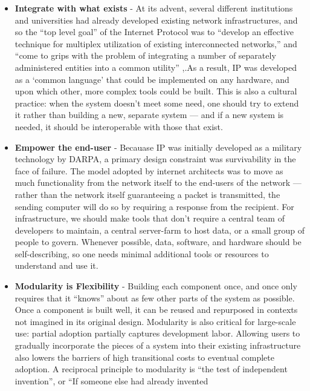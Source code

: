 \documentclass{article}
\begin{document}
\begin{itemize}

\item
  \textbf{Integrate with what exists} - At its advent, several different
  institutions and universities had already developed existing network
  infrastructures, and so the ``top level goal'' of the Internet
  Protocol was to ``develop an effective technique for multiplex
  utilization of existing interconnected networks,'' and ``come to grips
  with the problem of integrating a number of separately administered
  entities into a common utility'' \cite{clarkDesignPhilosophyDARPA1988},.As a result, IP was developed as
  a `common language' that could be implemented on any hardware, and
  upon which other, more complex tools could be built. This is also a
  cultural practice: when the system doesn't meet some need, one should
  try to extend it rather than building a new, separate system --- and
  if a new system is needed, it should be interoperable with those that
  exist.
\item
  \textbf{Empower the end-user} - Becauase IP was initially developed as
  a military technology by DARPA, a primary design constraint was
  survivability in the face of failure. The model adopted by internet
  architects was to move as much functionality from the network itself
  to the end-users of the network --- rather than the network itself
  guaranteeing a packet is transmitted, the sending computer will do so
  by requiring a response from the recipient. For infrastructure, we
  should make tools that don't require a central team of developers to
  maintain, a central server-farm to host data, or a small group of
  people to govern. Whenever possible, data, software, and hardware
  should be self-describing, so one needs minimal additional tools or
  resources to understand and use it.
\item
  \textbf{Modularity is Flexibility} - Building each component once, and
  once only requires that it ``knows'' about as few other parts of the
  system as possible. Once a component is built well, it can be reused
  and repurposed in contexts not imagined in its original design.
  Modularity is also critical for large-scale use: partial adoption
  partially captures development labor. Allowing users to gradually
  incorporate the pieces of a system into their existing infrastructure
  also lowers the barriers of high transitional costs to eventual
  complete adoption. A reciprocal principle to modularity is ``the test
  of independent invention'', or ``If someone else had already invented

\end{itemize}
\end{document}
